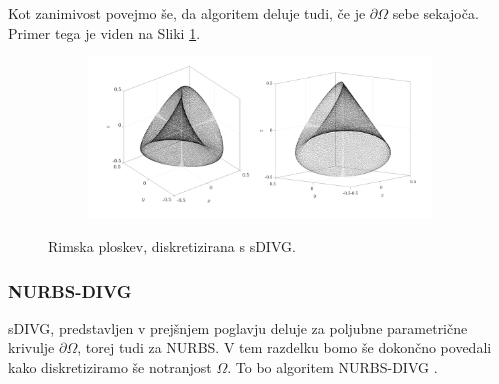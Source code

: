 \documentclass{article}
\begin{document}
Kot zanimivost povejmo še, da algoritem deluje tudi, če je $\partial \Omega$ sebe sekajoča. Primer tega je viden na Sliki \ref{fig:sdivgRoman}.
\begin{figure}[H]
\centering
\begin{subfigure}{.8\textwidth}
\includegraphics[width=\linewidth]{Slike/sdivgRoman.png}
\end{subfigure}
\caption{Rimska ploskev, diskretizirana s sDIVG.}
\label{fig:sdivgRoman}
\end{figure}
\subsubsection{NURBS-DIVG}
sDIVG, predstavljen v prejšnjem poglavju deluje za poljubne parametrične krivulje $\partial \Omega$, torej tudi za NURBS.
V tem razdelku bomo še dokončno povedali kako diskretiziramo še notranjost $\Omega$. To bo algoritem NURBS-DIVG \cite{nurbsdivg}.
\end{document}
